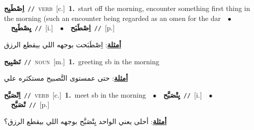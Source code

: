 \documentclass[10pt,a4paper,twoside]{article} %
\begin{document}
\begin{multicols}{2}
{{{{{\setlength\topsep{0pt}\textbf{\foreignlanguage{arabic}{اِصْطَبِح}}\ {\color{gray}\texttt{//}\color{black}}\ \textsc{verb}\ [c.]\ \textbf{1.}~start off the morning, encounter something first thing in the morning (such an encounter being regarded as an omen for the dar\ \ $\bullet$\ \ \setlength\topsep{0pt}\textbf{\foreignlanguage{arabic}{يِصْطَبِح}}\ {\color{gray}\texttt{//}\color{black}}\ [i.]\ \ $\bullet$\ \ \setlength\topsep{0pt}\textbf{\foreignlanguage{arabic}{اِصْطَبَح}}\ {\color{gray}\texttt{//}\color{black}}\ [p.]\  \begin{flushright}\color{gray}\foreignlanguage{arabic}{\textbf{\underline{\foreignlanguage{arabic}{أمثلة}}}: اِصْطَبَحت بوجهه اللي بيقطع الرزق}\end{flushright}\color{black}} \vspace{2mm}

{\setlength\topsep{0pt}\textbf{\foreignlanguage{arabic}{تَصْبِيح}}\ {\color{gray}\texttt{//}\color{black}}\ \textsc{noun}\ [m.]\ \textbf{1.}~greeting sb in the morning\  \begin{flushright}\color{gray}\foreignlanguage{arabic}{\textbf{\underline{\foreignlanguage{arabic}{أمثلة}}}: حتى عمستوى التَّصبيح مستكثره علي}\end{flushright}\color{black}} \vspace{2mm}

{\setlength\topsep{0pt}\textbf{\foreignlanguage{arabic}{اِتْصَبَّح}}\ {\color{gray}\texttt{//}\color{black}}\ \textsc{verb}\ [c.]\ \textbf{1.}~meet sb in the morning\ \ $\bullet$\ \ \setlength\topsep{0pt}\textbf{\foreignlanguage{arabic}{يِتْصَبَّح}}\ {\color{gray}\texttt{//}\color{black}}\ [i.]\ \ $\bullet$\ \ \setlength\topsep{0pt}\textbf{\foreignlanguage{arabic}{تْصَبَّح}}\ {\color{gray}\texttt{//}\color{black}}\ [p.]\  \begin{flushright}\color{gray}\foreignlanguage{arabic}{\textbf{\underline{\foreignlanguage{arabic}{أمثلة}}}: أحلى يعني الواحد يِتْصَبَّح بوجهه اللي بيقطع الرزق؟}\end{flushright}\color{black}} \vspace{2mm}

}}}}
\end{multicols}
\end{document}
